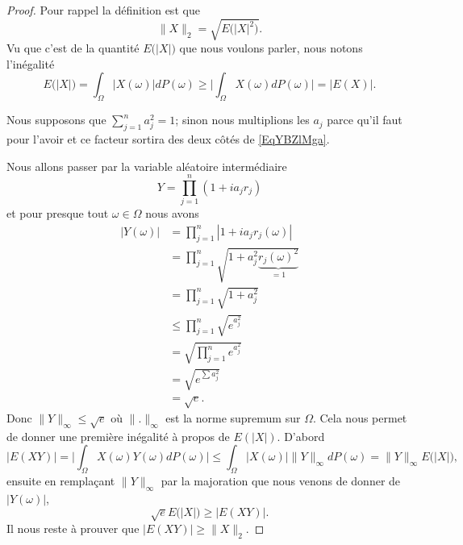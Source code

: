 \begin{proof}
	Pour rappel la définition est que
	\begin{equation}
		\| X \|_2=\sqrt{  E\big( | X |^2 \big)}.
	\end{equation}
	Vu que c'est de la quantité \( E\big( | X | \big)\) que nous voulons parler, nous notons l'inégalité
	\begin{equation}
		E\big( | X | \big)=\int_{\Omega}\big| X(\omega) \big|dP(\omega)\geq \big| \int_{\Omega}X(\omega)dP(\omega) \big|=\big| E(X) \big|.
	\end{equation}

	Nous supposons que \( \sum_{j=1}^na_j^2=1\); sinon nous multiplions les \(a_j\) parce qu'il faut pour l'avoir et ce facteur sortira des deux côtés de \eqref{EqYBZlMga}.

	Nous allons passer par la variable aléatoire intermédiaire
	\begin{equation}
		Y=\prod_{j=1}^n(1+ia_jr_j)
	\end{equation}
	et pour presque tout \( \omega\in \Omega\) nous avons
	\begin{subequations}
		\begin{align}
			| Y(\omega) | & =\prod_{j=1}^n| 1+ia_jr_j(\omega) |                         \\
			              & =\prod_{j=1}^n\sqrt{1+a^2_j\underbrace{r_j(\omega)^2}_{=1}} \\
			              & =\prod_{j=1}^n\sqrt{1+a_j^2 }                               \\
			              & \leq\prod_{j=1}^n\sqrt{  e^{a_j^2} }                        \\
			              & =\sqrt{\prod_{j=1}^n e^{a_j^2}}                             \\
			              & =\sqrt{ e^{\sum a_j^2}}                                     \\
			              & =\sqrt{e}.
		\end{align}
	\end{subequations}
	Donc \( \| Y \|_{\infty}\leq \sqrt{e}\) où \( \| . \|_{\infty}\) est la norme supremum sur \( \Omega\). Cela nous permet de donner une première inégalité à propos de \( E(| X |)\). D'abord
	\begin{equation}
		\big| E(XY) \big|=\big| \int_{\Omega}X(\omega)Y(\omega)dP(\omega) \big|\leq \int_{\Omega}\big| X(\omega) \big|\| Y \|_{\infty}dP(\omega)=\| Y \|_{\infty}E\big( | X | \big),
	\end{equation}
	ensuite en remplaçant \( \| Y \|_{\infty}\) par la majoration que nous venons de donner de \( | Y(\omega) |\),
	\begin{equation} \label{EqYVbzyGb}
		\sqrt{e}E\big( | X | \big)\geq \big| E(XY) \big|.
	\end{equation}
	Il nous reste à prouver que \( \big| E(XY) \big|\geq \| X \|_2\).


\end{proof}
